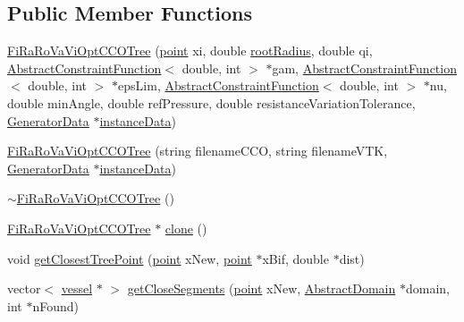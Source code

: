 \subsection*{Public Member Functions}
\begin{DoxyCompactItemize}
\item 
\mbox{\hyperlink{class_fi_ra_ro_va_vi_opt_c_c_o_tree_ac2d5f0113e6130aad2c70d650ea3cc50}{Fi\+Ra\+Ro\+Va\+Vi\+Opt\+C\+C\+O\+Tree}} (\mbox{\hyperlink{structpoint}{point}} xi, double \mbox{\hyperlink{class_fi_ra_ro_va_vi_opt_c_c_o_tree_a6774c4c4a44bfc656321922c0d8cf5c3}{root\+Radius}}, double qi, \mbox{\hyperlink{class_abstract_constraint_function}{Abstract\+Constraint\+Function}}$<$ double, int $>$ $\ast$gam, \mbox{\hyperlink{class_abstract_constraint_function}{Abstract\+Constraint\+Function}}$<$ double, int $>$ $\ast$eps\+Lim, \mbox{\hyperlink{class_abstract_constraint_function}{Abstract\+Constraint\+Function}}$<$ double, int $>$ $\ast$nu, double min\+Angle, double ref\+Pressure, double resistance\+Variation\+Tolerance, \mbox{\hyperlink{class_generator_data}{Generator\+Data}} $\ast$\mbox{\hyperlink{class_abstract_c_c_o_tree_afd240b7fad46ddf0a2ed78558cc9b9ca}{instance\+Data}})
\item 
\mbox{\hyperlink{class_fi_ra_ro_va_vi_opt_c_c_o_tree_a055410e9df6c8b8bc43402853dc35005}{Fi\+Ra\+Ro\+Va\+Vi\+Opt\+C\+C\+O\+Tree}} (string filename\+C\+CO, string filename\+V\+TK, \mbox{\hyperlink{class_generator_data}{Generator\+Data}} $\ast$\mbox{\hyperlink{class_abstract_c_c_o_tree_afd240b7fad46ddf0a2ed78558cc9b9ca}{instance\+Data}})
\item 
\mbox{\hyperlink{class_fi_ra_ro_va_vi_opt_c_c_o_tree_a344bca964ae2ced7bd165204a4e7a771}{$\sim$\+Fi\+Ra\+Ro\+Va\+Vi\+Opt\+C\+C\+O\+Tree}} ()
\item 
\mbox{\hyperlink{class_fi_ra_ro_va_vi_opt_c_c_o_tree}{Fi\+Ra\+Ro\+Va\+Vi\+Opt\+C\+C\+O\+Tree}} $\ast$ \mbox{\hyperlink{class_fi_ra_ro_va_vi_opt_c_c_o_tree_ab22030cefeda0a93307a901fa8baded1}{clone}} ()
\item 
void \mbox{\hyperlink{class_fi_ra_ro_va_vi_opt_c_c_o_tree_adcec940597abfdec6b02406622c97b18}{get\+Closest\+Tree\+Point}} (\mbox{\hyperlink{structpoint}{point}} x\+New, \mbox{\hyperlink{structpoint}{point}} $\ast$x\+Bif, double $\ast$dist)
\item 
vector$<$ \mbox{\hyperlink{structvessel}{vessel}} $\ast$ $>$ \mbox{\hyperlink{class_fi_ra_ro_va_vi_opt_c_c_o_tree_ac109dbefb3e313f9454e74a226a2ad6f}{get\+Close\+Segments}} (\mbox{\hyperlink{structpoint}{point}} x\+New, \mbox{\hyperlink{class_abstract_domain}{Abstract\+Domain}} $\ast$domain, int $\ast$n\+Found)

\end{DoxyCompactItemize}
